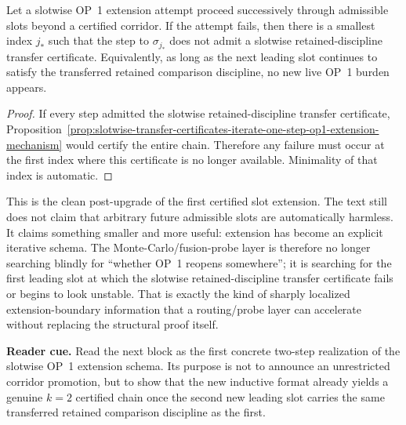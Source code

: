 \begin{corollary}
\label{cor:first-failure-slotwise-extension-attempt-localizes-first-uncertified-leading-slot}
Let a slotwise OP~1 extension attempt proceed successively through admissible slots beyond a certified corridor. If the attempt fails, then there is a smallest index $j_\ast$ such that the step to $\sigma_{j_\ast}$ does not admit a slotwise retained-discipline transfer certificate. Equivalently, as long as the next leading slot continues to satisfy the transferred retained comparison discipline, no new live OP~1 burden appears.
\end{corollary}

\begin{proof}
If every step admitted the slotwise retained-discipline transfer certificate, Proposition~\ref{prop:slotwise-transfer-certificates-iterate-one-step-op1-extension-mechanism} would certify the entire chain. Therefore any failure must occur at the first index where this certificate is no longer available. Minimality of that index is automatic.
\end{proof}

\begin{remark}
\label{rem:what-iterable-slotwise-extension-schema-now-buys}
This is the clean post-upgrade of the first certified slot extension. The text still does not claim that arbitrary future admissible slots are automatically harmless. It claims something smaller and more useful: extension has become an explicit iterative schema. The Monte-Carlo/fusion-probe layer is therefore no longer searching blindly for ``whether OP~1 reopens somewhere''; it is searching for the first leading slot at which the slotwise retained-discipline transfer certificate fails or begins to look unstable. That is exactly the kind of sharply localized extension-boundary information that a routing/probe layer can accelerate without replacing the structural proof itself.
\end{remark}


\noindent\textbf{Reader cue.} Read the next block as the first concrete two-step realization of the slotwise OP~1 extension schema. Its purpose is not to announce an unrestricted corridor promotion, but to show that the new inductive format already yields a genuine $k=2$ certified chain once the second new leading slot carries the same transferred retained comparison discipline as the first.

